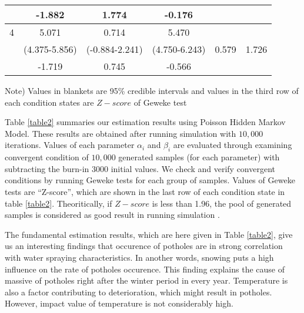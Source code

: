 \documentclass[a4paper,oneside,onecolumn,preprint,10pt,authoryear]{elsarticle}
\begin{document}
\begin{table}
\begin{center}
{\begin{tabular}{l|l|l|l|l|l}
\multicolumn{1}{c|}{} & \multicolumn{1}{c|}{-1.882}  & \multicolumn{1}{c|}{1.774}& \multicolumn{1}{c|}{-0.176}& \multicolumn{1}{c|}{}& \multicolumn{1}{c}{}\\ 
\hline
\multicolumn{1}{c|}{4} & \multicolumn{1}{c|}{5.071}  & \multicolumn{1}{c|}{0.714}& \multicolumn{1}{c|}{5.470}&  \multicolumn{1}{c|}{}& \multicolumn{1}{c}{}\\ 
\multicolumn{1}{c|}{} & \multicolumn{1}{c|}{(4.375-5.856)}  & \multicolumn{1}{c|}{(-0.884-2.241)} & \multicolumn{1}{c|}{(4.750-6.243)}&  \multicolumn{1}{c|}{0.579}& \multicolumn{1}{c}{1.726}\\ 
\multicolumn{1}{c|}{} & \multicolumn{1}{c|}{-1.719}  & \multicolumn{1}{c|}{0.745}& \multicolumn{1}{c|}{-0.566}&  \multicolumn{1}{c|}{}& \multicolumn{1}{c}{}\\ 
\hline
\end{tabular}}
\end{center}
{\small Note) Values in blankets are 95\% credible intervals and values in the third row of each condition states are $Z-score$ of Geweke test}
\end{table}

Table \ref{table2} summaries our estimation results using Poisson Hidden Markov Model. These results are obtained after running simulation with $10,000$ iterations. Values of each parameter $\alpha_i$ and $\beta_i$ are evaluated through examining convergent condition of $10,000$ generated samples (for each parameter) with subtracting the burn-in $3000$ initial values. We check and verify convergent conditions by running Geweke tests for each group of samples. Values of Geweke tests are ``Z-score'', which are shown in the last row of each condition state in table \ref{table2}. Theoritically, if $Z-score$ is less than 1.96, the pool of generated samples is considered as good result in running simulation \cite{geweke}. 

The fundamental estimation results, which are here given in Table \ref{table2}, give us an interesting findings that occurence of potholes are in strong correlation with water spraying characteristics. In another words, snowing puts a high influence on the rate of potholes occurence. This finding explains the cause of massive of potholes right after the winter period in every year. Temperature is also a factor contributing to deterioration, which might result in potholes. However, impact value of temperature is not considerably high. 
\end{document}
